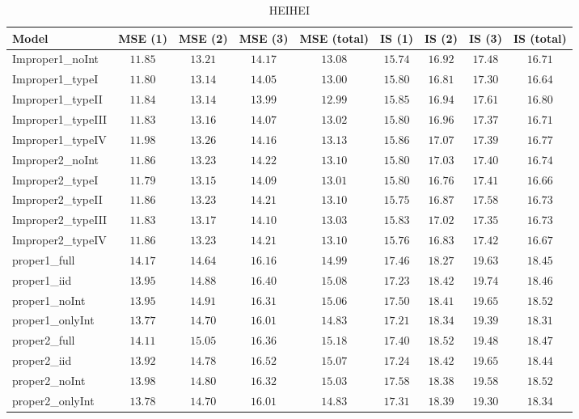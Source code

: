 \begin{table}

\caption{\label{tab:model-choice-sc3}HEIHEI}
\centering
\begin{tabular}{lcccccccc}
\hline
Model  & MSE (1) & MSE (2) & MSE (3) & MSE (total) & IS (1) & IS (2) & IS (3) & \multicolumn{1}{c}{IS (total)} \\ 
\hline
Improper1_noInt  & $11.85$ & $13.21$ & $14.17$ & $13.08$ & $15.74$ & $16.92$ & $17.48$ & $16.71$ \\
Improper1_typeI  & $11.80$ & $13.14$ & $14.05$ & $13.00$ & $15.80$ & $16.81$ & $17.30$ & $16.64$ \\
Improper1_typeII  & $11.84$ & $13.14$ & $13.99$ & $12.99$ & $15.85$ & $16.94$ & $17.61$ & $16.80$ \\
Improper1_typeIII  & $11.83$ & $13.16$ & $14.07$ & $13.02$ & $15.80$ & $16.96$ & $17.37$ & $16.71$ \\
Improper1_typeIV  & $11.98$ & $13.26$ & $14.16$ & $13.13$ & $15.86$ & $17.07$ & $17.39$ & $16.77$ \\
Improper2_noInt  & $11.86$ & $13.23$ & $14.22$ & $13.10$ & $15.80$ & $17.03$ & $17.40$ & $16.74$ \\
Improper2_typeI  & $11.79$ & $13.15$ & $14.09$ & $13.01$ & $15.80$ & $16.76$ & $17.41$ & $16.66$ \\
Improper2_typeII  & $11.86$ & $13.23$ & $14.21$ & $13.10$ & $15.75$ & $16.87$ & $17.58$ & $16.73$ \\
Improper2_typeIII  & $11.83$ & $13.17$ & $14.10$ & $13.03$ & $15.83$ & $17.02$ & $17.35$ & $16.73$ \\
Improper2_typeIV  & $11.86$ & $13.23$ & $14.21$ & $13.10$ & $15.76$ & $16.83$ & $17.42$ & $16.67$ \\
proper1_full  & $14.17$ & $14.64$ & $16.16$ & $14.99$ & $17.46$ & $18.27$ & $19.63$ & $18.45$ \\
proper1_iid  & $13.95$ & $14.88$ & $16.40$ & $15.08$ & $17.23$ & $18.42$ & $19.74$ & $18.46$ \\
proper1_noInt  & $13.95$ & $14.91$ & $16.31$ & $15.06$ & $17.50$ & $18.41$ & $19.65$ & $18.52$ \\
proper1_onlyInt  & $13.77$ & $14.70$ & $16.01$ & $14.83$ & $17.21$ & $18.34$ & $19.39$ & $18.31$ \\
proper2_full  & $14.11$ & $15.05$ & $16.36$ & $15.18$ & $17.40$ & $18.52$ & $19.48$ & $18.47$ \\
proper2_iid  & $13.92$ & $14.78$ & $16.52$ & $15.07$ & $17.24$ & $18.42$ & $19.65$ & $18.44$ \\
proper2_noInt  & $13.98$ & $14.80$ & $16.32$ & $15.03$ & $17.58$ & $18.38$ & $19.58$ & $18.52$ \\
proper2_onlyInt  & $13.78$ & $14.70$ & $16.01$ & $14.83$ & $17.31$ & $18.39$ & $19.30$ & $18.34$ \\
\hline 
\end{tabular}


\end{table}